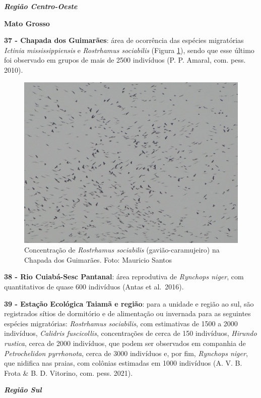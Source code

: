 \documentclass[
  oneside]{scrbook}
\begin{document}
\textbf{\emph{Região Centro-Oeste}}

\textbf{Mato Grosso}

\textbf{37 - Chapada dos Guimarães}: área de ocorrência das espécies migratórias \emph{Ictinia mississippiensis} e \emph{Rostrhamus sociabilis} (Figura \ref{fig:26}), sendo que esse último foi observado em grupos de mais de 2500 indivíduos (P. P. Amaral, com. pess. 2010).

\begin{figure}[H]

{\centering \includegraphics[width=0.75\linewidth]{imagens/cap07/Figura_7.6} 

}

\caption{Concentração de \emph{Rostrhamus sociabilis} (gavião-caramujeiro) na Chapada dos Guimarães. Foto: Mauricio Santos}\label{fig:26}
\end{figure}



\textbf{38 - Rio Cuiabá-Sesc Pantanal}: área reprodutiva de \emph{Rynchops niger}, com quantitativos de quase 600 indivíduos (Antas et al.~2016).

\textbf{39 - Estação Ecológica Taiamã e região}: para a unidade e região ao sul, são registrados sítios de dormitório e de alimentação ou invernada para as seguintes espécies migratórias: \emph{Rostrhamus sociabilis}, com estimativas de 1500 a 2000 indivíduos, \emph{Calidris fuscicollis}, concentrações de cerca de 150 indivíduos, \emph{Hirundo rustica}, cerca de 2000 indivíduos, que podem ser observados em companhia de \emph{Petrochelidon pyrrhonota}, cerca de 3000 indivíduos e, por fim, \emph{Rynchops niger}, que nidifica nas praias, com colônias estimadas em 1000 indivíduos (A. V. B. Frota \& B. D. Vitorino, com. pess. 2021).

\textbf{\emph{Região Sul}}
\end{document}
